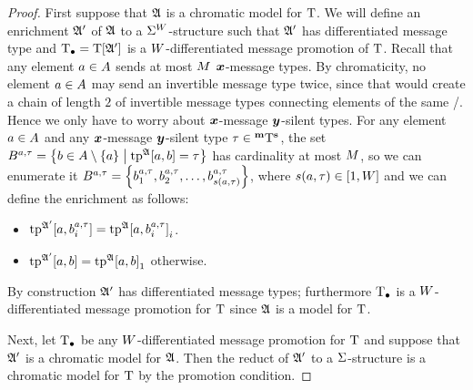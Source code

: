 \begin{proof}
First suppose that $\mathfrak{A}$ is a chromatic model for $\mathrm{T}$.
We will define an enrichment $\mathfrak{A'}$ of $\mathfrak{A}$ to a ${\mathrm{\Sigma}}^{W}$-structure
such that $\mathfrak{A'}$ has differentiated message type and $\mathrm{T}_{\bullet} = \mathrm{T}[\mathfrak{A'}]$ is a
$W$-differentiated message promotion of $\mathrm{T}$.
Recall that any element $a\in A$ sends at most $M$ $\bm{x}$-message types.
By chromaticity, no element $a\in A$ may send an invertible message type
twice, since that would create a chain of length $2$ of invertible message types
connecting elements of the same \onetype/.
Hence we only have to worry about $\bm{x}$-message $\bm{y}$-silent types.
For any element $a\in A$ and any $\bm{x}$-message $\bm{y}$-silent type
$\tau\in{{}^{\bm{\mathrm{m}}}{\mathrm{T}}^{\bm{\mathrm{s}}}}$, the set
$B^{a,\tau} = \left\{b\in A\setminus\left\{a\right\}\mathrel{}\middle|\mathrel{}\operatorname{tp}^{\mathfrak{A}}[a,b]=\tau\right\}$ has
cardinality at most $M$, so we can enumerate it $B^{a,\tau} =
\left\{b^{a,\tau}_1,b^{a,\tau}_2,\dots,b^{a,\tau}_{s(a,\tau)}\right\}$,
where $s(a,\tau)\in[1,W]$ and we can define the enrichment as follows:
\begin{itemize}
  \item $\operatorname{tp}^{\mathfrak{A'}}[a,b^{a,\tau}_i] =
  {\operatorname{tp}^{\mathfrak{A}}[a,b^{a,\tau}_i]}_{i}$.
  \item $\operatorname{tp}^{\mathfrak{A'}}[a,b] = {\operatorname{tp}^{\mathfrak{A}}[a,b]}_{1}$ otherwise.
\end{itemize}
By construction $\mathfrak{A'}$ has differentiated message types; furthermore $\mathrm{T}_{\bullet}$ is
a $W$-differentiated message promotion for $\mathrm{T}$ since $\mathfrak{A}$ is a model for
$\mathrm{T}$.

Next, let $\mathrm{T}_{\bullet}$ be any $W$-differentiated message promotion for $\mathrm{T}$ and
suppose that $\mathfrak{A'}$ is a chromatic model for $\mathfrak{A}$. Then the reduct of
$\mathfrak{A'}$ to a $\mathrm{\Sigma}$-structure is a chromatic model for $\mathrm{T}$ by the promotion
condition.
\end{proof}

